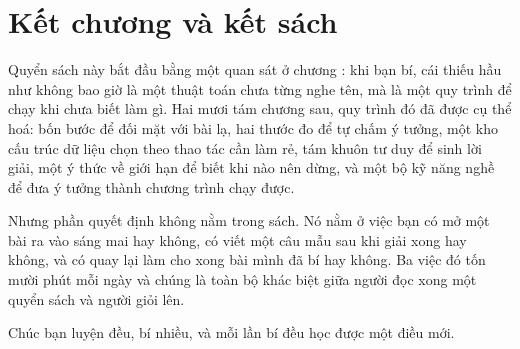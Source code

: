 \documentclass[../../algorithm.tex]{subfiles}
\begin{document}
\section*{Kết chương và kết sách}

Quyển sách này bắt đầu bằng một quan sát ở chương : khi bạn bí, cái thiếu hầu như không bao giờ là một thuật toán chưa từng nghe tên, mà là một quy trình để chạy khi chưa biết làm gì. Hai mươi tám chương sau, quy trình đó đã được cụ thể hoá: bốn bước để đối mặt với bài lạ, hai thước đo để tự chấm ý tưởng, một kho cấu trúc dữ liệu chọn theo thao tác cần làm rẻ, tám khuôn tư duy để sinh lời giải, một ý thức về giới hạn để biết khi nào nên dừng, và một bộ kỹ năng nghề để đưa ý tưởng thành chương trình chạy được.

Nhưng phần quyết định không nằm trong sách. Nó nằm ở việc bạn có mở một bài ra vào sáng mai hay không, có viết một câu mẫu sau khi giải xong hay không, và có quay lại làm cho xong bài mình đã bí hay không. Ba việc đó tốn mười phút mỗi ngày và chúng là toàn bộ khác biệt giữa người đọc xong một quyển sách và người giỏi lên.

Chúc bạn luyện đều, bí nhiều, và mỗi lần bí đều học được một điều mới.
\ifSubfilesClassLoaded{\printbibliography[title={Nguồn}]}{}
\end{document}
